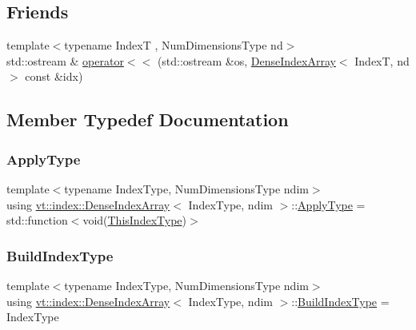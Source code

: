 \subsection*{Friends}
\begin{DoxyCompactItemize}
\item 
{\footnotesize template$<$typename IndexT , Num\+Dimensions\+Type nd$>$ }\\std\+::ostream \& \hyperlink{structvt_1_1index_1_1_dense_index_array_ad8dd7b7925f5c66e3264bd14c3e4f2ce}{operator$<$$<$} (std\+::ostream \&os, \hyperlink{structvt_1_1index_1_1_dense_index_array}{Dense\+Index\+Array}$<$ IndexT, nd $>$ const \&idx)
\end{DoxyCompactItemize}


\subsection{Member Typedef Documentation}
\mbox{\label{structvt_1_1index_1_1_dense_index_array_ab44b9e5a65d28520268523fbe99f6a9d}} 
\subsubsection{\texorpdfstring{Apply\+Type}{ApplyType}}
{\footnotesize\ttfamily template$<$typename Index\+Type, Num\+Dimensions\+Type ndim$>$ \\
using \hyperlink{structvt_1_1index_1_1_dense_index_array}{vt\+::index\+::\+Dense\+Index\+Array}$<$ Index\+Type, ndim $>$\+::\hyperlink{structvt_1_1index_1_1_dense_index_array_ab44b9e5a65d28520268523fbe99f6a9d}{Apply\+Type} =  std\+::function$<$void(\hyperlink{structvt_1_1index_1_1_dense_index_array_a6915511f6a82dff2522d6e8c2be20f2a}{This\+Index\+Type})$>$}

\mbox{\label{structvt_1_1index_1_1_dense_index_array_a84d2aa360d257c9b1d7e324088c7763b}} 
\subsubsection{\texorpdfstring{Build\+Index\+Type}{BuildIndexType}}
{\footnotesize\ttfamily template$<$typename Index\+Type, Num\+Dimensions\+Type ndim$>$ \\
using \hyperlink{structvt_1_1index_1_1_dense_index_array}{vt\+::index\+::\+Dense\+Index\+Array}$<$ Index\+Type, ndim $>$\+::\hyperlink{structvt_1_1index_1_1_dense_index_array_a84d2aa360d257c9b1d7e324088c7763b}{Build\+Index\+Type} =  Index\+Type}

